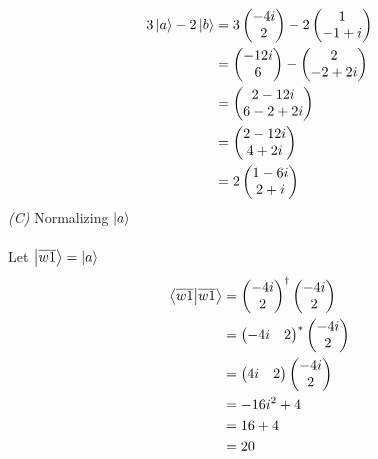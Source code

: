 \documentclass{article}
\begin{document}
\begin{align*}
3\ket{a} - 2\ket{b} &= 3\begin{pmatrix} -4i \\ 2 \end{pmatrix} - 2\begin{pmatrix} 1 \\ -1 + i \end{pmatrix}\\
&= \begin{pmatrix} -12i \\ 6 \end{pmatrix} - \begin{pmatrix} 2 \\ -2 + 2i \end{pmatrix}\\
&= \begin{pmatrix} 2-12i \\ 6-2+2i \end{pmatrix}\\
&= \begin{pmatrix} 2-12i \\ 4+2i \end{pmatrix}\\
&= 2\begin{pmatrix} 1-6i \\ 2+i \end{pmatrix}\\
\end{align*}
\textit{(C)}
Normalizing $\ket{a}$\\ \\
Let $\ket{\overline{w1}} = {\ket{a}}$\\
\begin{align*}
\bra{\overline{w1}}\ket{\overline{w1}} &= \begin{pmatrix} -4i \\ 2 \end{pmatrix}^\dag \begin{pmatrix} -4i \\ 2 \end{pmatrix}\\
&= \begin{pmatrix} -4i & 2 \end{pmatrix}^* \begin{pmatrix} -4i \\ 2 \end{pmatrix}\\
&= \begin{pmatrix} 4i & 2 \end{pmatrix} \begin{pmatrix} -4i \\ 2 \end{pmatrix}\\
&= -16i^2 + 4\\
&= 16 + 4\\
&= 20
\end{align*}
\end{document}

